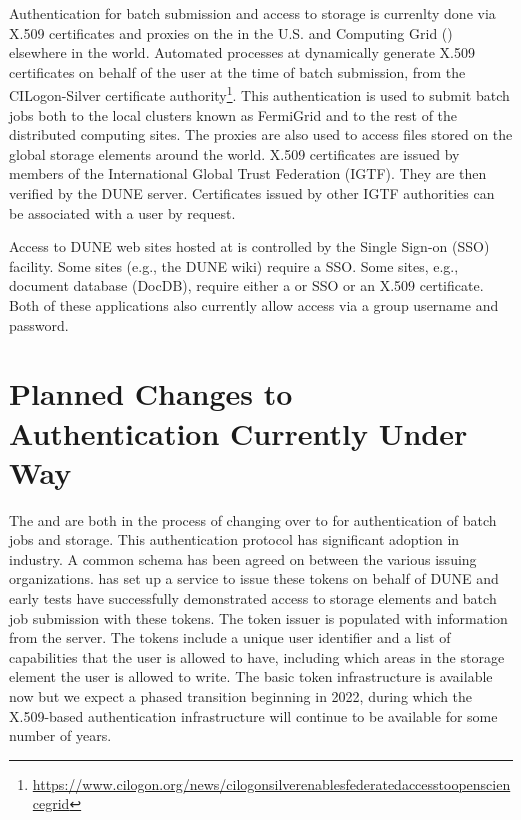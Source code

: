 \documentclass[../main-v1.tex]{subfiles}
\begin{document}
Authentication for batch submission and access to storage is currenlty done via X.509 certificates and proxies
on the %
 in the U.S. and  %
Computing Grid () elsewhere in the world.  %
Automated processes %
at  %
dynamically generate 
X.509 certificates on behalf of the user at the time of batch submission, from the CILogon-Silver 
certificate authority\footnote{\url{https://www.cilogon.org/news/cilogonsilverenablesfederatedaccesstoopensciencegrid}}. This authentication is used to submit batch jobs both to the local
 clusters known as FermiGrid and to the rest of the distributed computing sites.  The proxies are
also used to access files %
stored on the global storage elements around the world.  
X.509 certificates are issued by members of the International Global Trust Federation (IGTF).  They are then verified 
by the DUNE  server.  Certificates issued by other IGTF authorities can be associated with a user by request.

Access to DUNE web sites hosted at  is controlled by the  Single Sign-on (SSO) facility.  Some sites (e.g., the DUNE wiki) %
require a  SSO.
 Some sites, e.g., %
document database (DocDB), require either a  or  SSO or  %
an X.509 certificate. %
Both of these applications also currently allow access via a group username and password.


\section{Planned Changes to Authentication Currently Under Way}

The  and  are both in the process of changing over to  %
for authentication of batch jobs and storage. This %
authentication protocol %
has significant adoption in industry. A common schema has been agreed on between the various issuing organizations. %
 has set up a %
service to issue these tokens on behalf of DUNE and early tests have %
successfully demonstrated access to storage elements and batch job submission with these tokens. %
The token issuer is populated with information from the  server. %
The tokens include a unique user identifier %
and a list of capabilities that the user is allowed to have, including which 
areas in the storage element the user is allowed to write.  The basic token infrastructure is available now but we expect a phased transition beginning in 2022, during which %
the X.509-based authentication infrastructure will continue to be available for some number of years.
\end{document}
